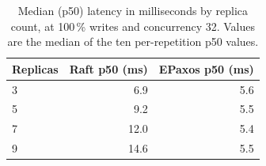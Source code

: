 \begin{table}[t]
\caption{Median (p50) latency in milliseconds by replica count, at
100\,\% writes and concurrency 32. Values are the median of the ten
per-repetition p50 values.}
\label{tab:latency}
\begin{tabular}{lrr}
\toprule
Replicas & Raft p50 (ms) & EPaxos p50 (ms) \\
\midrule
3 & 6.9 & 5.6 \\
5 & 9.2 & 5.5 \\
7 & 12.0 & 5.4 \\
9 & 14.6 & 5.5 \\
\bottomrule
\end{tabular}
\end{table}
